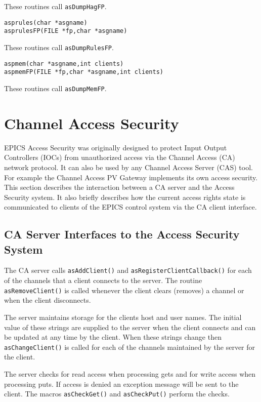 These routines call \verb|asDumpHagFP|.

\begin{verbatim}
asprules(char *asgname)
asprulesFP(FILE *fp,char *asgname)
\end{verbatim}

These routines call \verb|asDumpRulesFP|.

\begin{verbatim}
aspmem(char *asgname,int clients)
aspmemFP(FILE *fp,char *asgname,int clients)
\end{verbatim}

These routines call \verb|asDumpMemFP|.

\section{Channel Access Security}

EPICS Access Security was originally designed to protect Input Output Controllers (IOCs) from unauthorized access via the Channel Access (CA) network protocol.
It can also be used by any Channel Access Server (CAS) tool.
For example the Channel Access PV Gateway implements its own access security.
This section describes the interaction between a CA server and the Access Security system.
It also briefly describes how the current access rights state is communicated to clients of the EPICS control system via the CA client interface.

\subsection{CA Server Interfaces to the Access Security System}

The CA server calls \verb|asAddClient()| and \verb|asRegisterClientCallback()| for each of the channels that a client connects to the server.
The routine \verb|asRemoveClient()| is called whenever the client clears (removes) a channel or when the client disconnects.

The server maintains storage for the clients host and user names.
The initial value of these strings are supplied to the server when the client connects and can be updated at any time by the client.
When these strings change then \verb|asChangeClient()| is called for each of the channels maintained by the server for the client.

The server checks for read access when processing gets and for write access when processing puts.
If access is denied an exception message will be sent to the client.
The macros \verb|asCheckGet()| and \verb|asCheckPut()| perform the checks.

